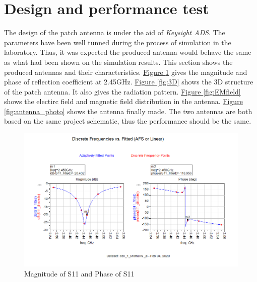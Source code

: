 \documentclass[12pt,a4paper]{report}
\begin{document}
\section{Design and performance test}
The design of the patch antenna is under the aid of \emph{Keysight ADS}. The parameters have been well tunned during the process of simulation in the laboratory. Thus, it was expected the produced antenna would behave the same as what had been shown on the simulation results.
This section shows the produced antennas and their characteristics.
\hyperref[fig:AntennaS11]{Figure \ref*{fig:AntennaS11}} gives the magnitude and phase of reflection coefficient at 2.45GHz. \hyperref[fig:3D]{Figure \ref*{fig:3D}} shows the 3D structure of the patch antenna.
It also gives the radiation pattern. \hyperref[fig:EMfield]{Figure \ref*{fig:EMfield}} shows the electirc field and magnetic field distribution in the antenna.
\hyperref[fig:antenna_photo]{Figure \ref*{fig:antenna_photo}} shows the antenna finally made. The two antennas are both based on the same project schematic, thus the performance should be the same.

\begin{figure}[H]
    \centerline{\includegraphics[scale=0.5]{Antenna_Simulation.PNG}}
    \caption{Magnitude of S11 and Phase of S11}
    \label{fig:AntennaS11}
\end{figure}
\end{document}
